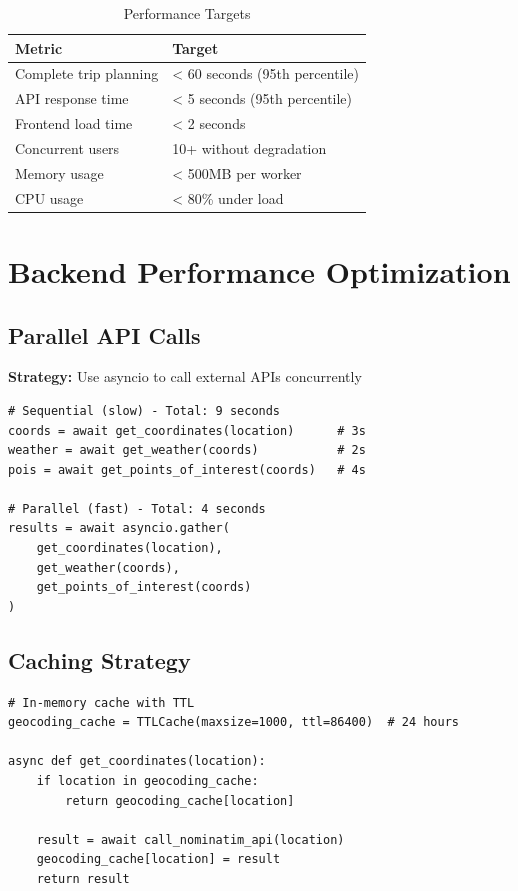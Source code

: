 \documentclass[12pt,a4paper]{report}
\begin{document}
\begin{table}[H]
\centering
\begin{tabular}{|l|l|}
\hline
\textbf{Metric} & \textbf{Target} \\
\hline
Complete trip planning & < 60 seconds (95th percentile) \\
\hline
API response time & < 5 seconds (95th percentile) \\
\hline
Frontend load time & < 2 seconds \\
\hline
Concurrent users & 10+ without degradation \\
\hline
Memory usage & < 500MB per worker \\
\hline
CPU usage & < 80\% under load \\
\hline
\end{tabular}
\caption{Performance Targets}
\label{tab:performance-targets}
\end{table}

\section{Backend Performance Optimization}

\subsection{Parallel API Calls}

\textbf{Strategy:} Use asyncio to call external APIs concurrently

\begin{lstlisting}[style=pythonstyle, caption={Parallel API Calls}]
# Sequential (slow) - Total: 9 seconds
coords = await get_coordinates(location)      # 3s
weather = await get_weather(coords)           # 2s
pois = await get_points_of_interest(coords)   # 4s

# Parallel (fast) - Total: 4 seconds
results = await asyncio.gather(
    get_coordinates(location),
    get_weather(coords),
    get_points_of_interest(coords)
)
\end{lstlisting}

\subsection{Caching Strategy}

\begin{lstlisting}[style=pythonstyle, caption={Geocoding Cache Implementation}]
# In-memory cache with TTL
geocoding_cache = TTLCache(maxsize=1000, ttl=86400)  # 24 hours

async def get_coordinates(location):
    if location in geocoding_cache:
        return geocoding_cache[location]
    
    result = await call_nominatim_api(location)
    geocoding_cache[location] = result
    return result
\end{lstlisting}
\end{document}
